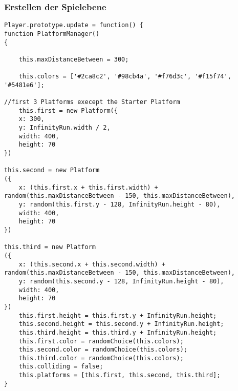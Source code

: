 \subsubsection{Erstellen der Spielebene}
\lstset{language=java}
\begin{lstlisting}[frame=single]
Player.prototype.update = function() {
function PlatformManager() 
{

	this.maxDistanceBetween = 300;

	this.colors = ['#2ca8c2', '#98cb4a', '#f76d3c', '#f15f74', '#5481e6'];

//first 3 Platforms execept the Starter Platform
	this.first = new Platform({
	x: 300,
	y: InfinityRun.width / 2,
	width: 400,
	height: 70
})

this.second = new Platform
({
	x: (this.first.x + this.first.width) + random(this.maxDistanceBetween - 150, this.maxDistanceBetween),
	y: random(this.first.y - 128, InfinityRun.height - 80),
	width: 400,
	height: 70
})

this.third = new Platform
({
	x: (this.second.x + this.second.width) + random(this.maxDistanceBetween - 150, this.maxDistanceBetween),
	y: random(this.second.y - 128, InfinityRun.height - 80),
	width: 400,
	height: 70
})
	this.first.height = this.first.y + InfinityRun.height;
	this.second.height = this.second.y + InfinityRun.height;
	this.third.height = this.third.y + InfinityRun.height;
	this.first.color = randomChoice(this.colors);
	this.second.color = randomChoice(this.colors);
	this.third.color = randomChoice(this.colors);
	this.colliding = false;
	this.platforms = [this.first, this.second, this.third];
}
\end{lstlisting}
